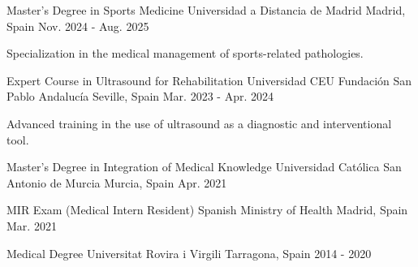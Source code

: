 

\begin{cventries}

  \cventry
    {Master's Degree in Sports Medicine} %
    {Universidad a Distancia de Madrid} %
    {Madrid, Spain} %
    {Nov. 2024 - Aug. 2025} %
    {
      \begin{cvitems} %
        \item {Specialization in the medical management of sports-related pathologies.}
      \end{cvitems}
    }

  \cventry
    {Expert Course in Ultrasound for Rehabilitation} %
    {Universidad CEU Fundación San Pablo Andalucía} %
    {Seville, Spain} %
    {Mar. 2023 - Apr. 2024} %
    {
      \begin{cvitems} %
        \item {Advanced training in the use of ultrasound as a diagnostic and interventional tool.}
      \end{cvitems}
    }

  \cventry
    {Master's Degree in Integration of Medical Knowledge} %
    {Universidad Católica San Antonio de Murcia} %
    {Murcia, Spain} %
    {Apr. 2021} %
    {}

  \cventry
    {MIR Exam (Medical Intern Resident)} %
    {Spanish Ministry of Health} %
    {Madrid, Spain} %
    {Mar. 2021} %
    {}

  \cventry
    {Medical Degree} %
    {Universitat Rovira i Virgili} %
    {Tarragona, Spain} %
    {2014 - 2020} %
    {}

\end{cventries}
